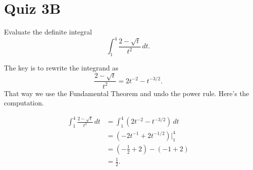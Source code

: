 \documentclass{ximera}
\begin{document}
\section{Quiz 3B}

\begin{question} \label{QKDFefggg}
Evaluate the definite integral
\[
  \int_1^4 \frac{2-\sqrt{t}}{t^2} \, dt.
\]

\begin{explanation}
The key is to rewrite the integrand as
\[
  \frac{2-\sqrt{t}}{t^2} = 2t^{-2} - t^{-3/2} .
\]
That way we use the Fundamental Theorem and undo the power rule. Here's the computation.

\begin{align*}
\int_1^4 \frac{2-\sqrt{t}}{t^2} \, dt  &= \int_1^4 (  2t^{-2} - t^{-3/2}  )\, dt  \\
                                                      &= \left(  -2t^{-1} + 2t^{-1/2}   \right)\Big|_1^4 \\
                                                      &= (-\frac{1}{2} + 2)  -(-1 + 2) \\
                                                       &=\frac{1}{2} .
\end{align*}

\end{explanation}

\end{question}
\end{document}
